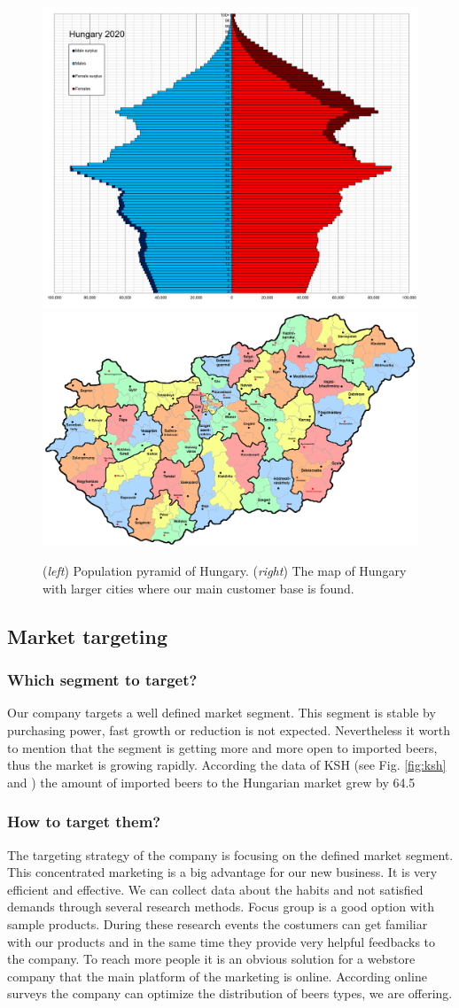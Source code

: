 \begin{figure}[H]
  \centering
  \includegraphics[width=0.45\linewidth]{pics/hungary.png}
  \includegraphics[width=0.45\linewidth]{pics/magyar.jpg}
  \caption{(\textit{left}) Population pyramid of Hungary.  (\textit{right}) The map of Hungary with larger cities where our main customer base is found.}
  \label{fig:hu}
\end{figure}

\subsection{Market targeting}

\subsubsection*{Which segment to target?}

Our company targets a well defined market segment. This segment is stable by purchasing power, fast growth or reduction is not expected. Nevertheless it worth to mention that the segment is getting more and more open to imported beers, thus the market is growing rapidly. According the data of KSH (see Fig. \ref{fig:ksh} and \cite{ksh2}) the amount of imported beers to the Hungarian market grew by 64.5%


\subsubsection*{How to target them?}

The targeting strategy of the company is focusing on the defined market segment. This concentrated marketing is a big advantage for our new business. It is very efficient and effective. We can collect data about the habits and not satisfied demands through several research methods.
Focus group is a good option with sample products. During these research events the costumers can get familiar with our products and in the same time they provide very helpful feedbacks to the company. To reach more people it is an obvious solution for a webstore company that the main platform of the marketing is online. According online surveys the company can optimize the distribution of beers types, we are offering.


